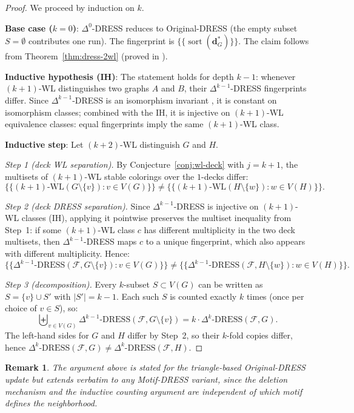 \documentclass[11pt,a4paper]{article}
\newtheorem{remark}[theorem]{Remark}
\begin{document}
\begin{proof}
We proceed by induction on $k$.

\textbf{Base case ($k=0$)}: $\Delta^0$-DRESS reduces to Original-DRESS (the empty subset $S = \emptyset$ contributes one run). The fingerprint is $\{\!\{\operatorname{sort}(\mathbf{d}^*_G)\}\!\}$. The claim follows from Theorem~\ref{thm:dress-2wl} (proved in \cite{castrillo2026dress}).

\textbf{Inductive hypothesis (IH)}: The statement holds for depth $k-1$: whenever $(k+1)$-WL distinguishes two graphs $A$ and $B$, their $\Delta^{k-1}$-DRESS fingerprints differ. Since $\Delta^{k-1}$-DRESS is an isomorphism invariant \cite{castrillo2026dress}, it is constant on isomorphism classes; combined with the IH, it is injective on $(k+1)$-WL equivalence classes: equal fingerprints imply the same $(k+1)$-WL class.

\textbf{Inductive step}: Let $(k+2)$-WL distinguish $G$ and $H$.

\textit{Step 1 (deck WL separation).} By Conjecture~\ref{conj:wl-deck} with $j = k+1$, the multisets of $(k+1)$-WL stable colorings over the $1$-decks differ:
\[
\{\!\{ (k{+}1)\text{-WL}(G \setminus \{v\}) : v \in V(G) \}\!\} \neq \{\!\{ (k{+}1)\text{-WL}(H \setminus \{w\}) : w \in V(H) \}\!\}.
\]

\textit{Step 2 (deck DRESS separation).} Since $\Delta^{k-1}$-DRESS is injective on $(k+1)$-WL classes (IH), applying it pointwise preserves the multiset inequality from Step~1: if some $(k+1)$-WL class $c$ has different multiplicity in the two deck multisets, then $\Delta^{k-1}$-DRESS maps $c$ to a unique fingerprint, which also appears with different multiplicity. Hence:
\[
\{\!\{ \Delta^{k-1}\text{-DRESS}(\mathcal{F}, G \setminus \{v\}) : v \in V(G) \}\!\} \neq \{\!\{ \Delta^{k-1}\text{-DRESS}(\mathcal{F}, H \setminus \{w\}) : w \in V(H) \}\!\}.
\]

\textit{Step 3 (decomposition).} Every $k$-subset $S \subset V(G)$ can be written as $S = \{v\} \cup S'$ with $|S'| = k-1$. Each such $S$ is counted exactly $k$ times (once per choice of $v \in S$), so:
\[
\biguplus_{v \in V(G)} \Delta^{k-1}\text{-DRESS}(\mathcal{F}, G \setminus \{v\}) = k \cdot \Delta^k\text{-DRESS}(\mathcal{F}, G).
\]
The left-hand sides for $G$ and $H$ differ by Step~2, so their $k$-fold copies differ, hence $\Delta^k\text{-DRESS}(\mathcal{F}, G) \neq \Delta^k\text{-DRESS}(\mathcal{F}, H)$.
\end{proof}

\begin{remark}
The argument above is stated for the triangle-based Original-DRESS update but extends verbatim to any Motif-DRESS variant, since the deletion mechanism and the inductive counting argument are independent of which motif defines the neighborhood.
\end{remark}
\end{document}
